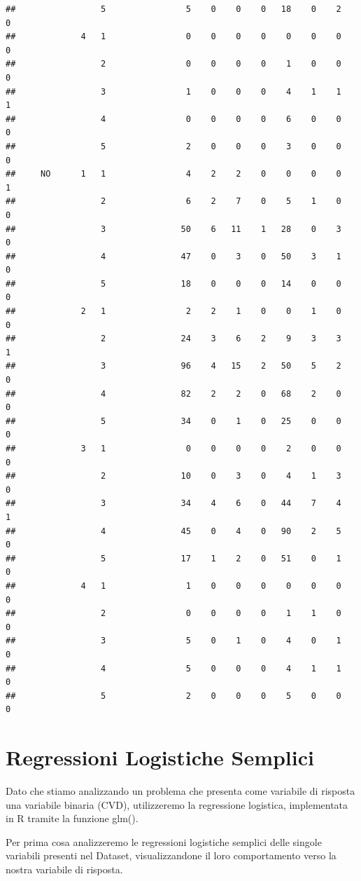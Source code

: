 \documentclass{article}\usepackage[]{graphicx}\usepackage[]{xcolor}
\makeatletter
\newenvironment{kframe}{%
 \def\at@end@of@kframe{}%
 \ifinner\ifhmode%
  \def\at@end@of@kframe{\end{minipage}}%
  \begin{minipage}{\columnwidth}%
 \fi\fi%
 \def\FrameCommand##1{\hskip\@totalleftmargin \hskip-\fboxsep
 \colorbox{shadecolor}{##1}\hskip-\fboxsep
     \hskip-\linewidth \hskip-\@totalleftmargin \hskip\columnwidth}%
 \MakeFramed {\advance\hsize-\width
   \@totalleftmargin\z@ \linewidth\hsize
   \@setminipage}}%
 {\par\unskip\endMakeFramed%
 \at@end@of@kframe}
\newenvironment{knitrout}{}{} %
\makeatother
\begin{document}
\begin{knitrout}
\begin{kframe}
\begin{verbatim}
##                 5                5    0    0    0   18    0    2    0
##             4   1                0    0    0    0    0    0    0    0
##                 2                0    0    0    0    1    0    0    0
##                 3                1    0    0    0    4    1    1    1
##                 4                0    0    0    0    6    0    0    0
##                 5                2    0    0    0    3    0    0    0
##     NO      1   1                4    2    2    0    0    0    0    1
##                 2                6    2    7    0    5    1    0    0
##                 3               50    6   11    1   28    0    3    0
##                 4               47    0    3    0   50    3    1    0
##                 5               18    0    0    0   14    0    0    0
##             2   1                2    2    1    0    0    1    0    0
##                 2               24    3    6    2    9    3    3    1
##                 3               96    4   15    2   50    5    2    0
##                 4               82    2    2    0   68    2    0    0
##                 5               34    0    1    0   25    0    0    0
##             3   1                0    0    0    0    2    0    0    0
##                 2               10    0    3    0    4    1    3    0
##                 3               34    4    6    0   44    7    4    1
##                 4               45    0    4    0   90    2    5    0
##                 5               17    1    2    0   51    0    1    0
##             4   1                1    0    0    0    0    0    0    0
##                 2                0    0    0    0    1    1    0    0
##                 3                5    0    1    0    4    0    1    0
##                 4                5    0    0    0    4    1    1    0
##                 5                2    0    0    0    5    0    0    0
\end{verbatim}
\end{kframe}
\end{knitrout}
    
\clearpage


\section{Regressioni Logistiche Semplici}
  Dato che stiamo analizzando un problema che presenta come variabile di 
  risposta una variabile binaria (CVD), utilizzeremo la regressione logistica, 
  implementata in R tramite la funzione glm(). \par
  Per prima cosa analizzeremo le regressioni logistiche semplici delle singole
  variabili presenti nel Dataset, visualizzandone il loro comportamento verso la
  nostra variabile di risposta.
  
\end{document}
